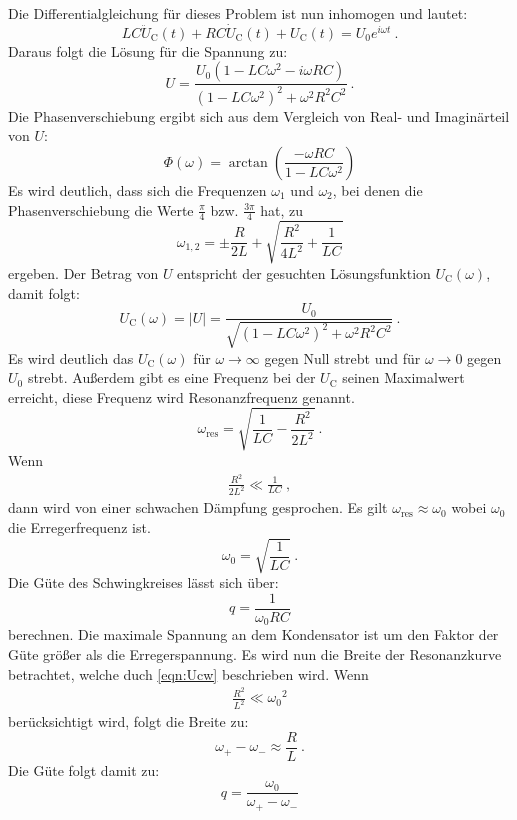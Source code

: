 Die Differentialgleichung für dieses Problem ist nun inhomogen und lautet:
\begin{equation}
	LC \ddot{U}_\text{C}(t) + RC \dot{U}_\text{C}(t) + U_\text{C}(t) = U_0 e^{i \omega t} \ .
\end{equation}
Daraus folgt die Lösung für die Spannung zu:
\begin{equation}
	U = \frac{U_0(1 - LC \omega^2 - i \omega RC)}{(1 - LC \omega^2)^2 + \omega^2 R^2 C^2} \ .
\end{equation}
Die Phasenverschiebung ergibt sich aus dem Vergleich von Real- und Imaginärteil von $U$:
\begin{equation}
	\Phi (\omega) = \arctan \left(\frac{-\omega RC}{1-LC\omega^2}  \right)
\end{equation}
Es wird deutlich, dass sich die Frequenzen $\omega_1$ und $\omega_2$, bei denen die Phasenverschiebung die Werte $\frac{\pi}{4}$ bzw. $\frac{3\pi}{4}$ hat, zu
\begin{equation}
	\omega_{1,2} = \pm \frac{R}{2L} + \sqrt{\frac{R^2}{4L^2} + \frac{1}{LC}}
	\label{eqn:w12}
\end{equation}
ergeben.
Der Betrag von $U$ entspricht der gesuchten Lösungsfunktion $U_\text{C}(\omega)$, damit folgt:
\begin{equation}
	U_\text{C}(\omega) = |U| = \frac{U_0}{\sqrt{(1 - LC \omega^2)^2 + \omega^2 R^2 C^2}} \ .
	\label{eqn:Ucw}
\end{equation}
Es wird deutlich das $U_\text{C}(\omega)$ für $\omega \to \infty$ gegen Null strebt und für $\omega \to 0$ gegen $U_0$ strebt. Außerdem gibt es eine Frequenz bei der $U_\text{C}$ seinen Maximalwert erreicht, diese Frequenz wird Resonanzfrequenz genannt.
\begin{equation}
	\omega_\text{res} = \sqrt{\frac{1}{LC} - \frac{R^2}{2L^2}} \ .
	\label{eqn:wres}
\end{equation}
Wenn
\begin{align*}
	\frac{R^2}{2L^2} \ll \frac{1}{LC} \ ,
\end{align*}
dann wird von einer schwachen Dämpfung gesprochen. Es gilt $\omega_\text{res} \approx \omega_0$ wobei $\omega_0$ die Erregerfrequenz ist.
\begin{equation}
	\omega_0 = \sqrt{\frac{1}{LC}} \ .
\end{equation}
Die Güte des Schwingkreises lässt sich über:
\begin{equation}
	q = \frac{1}{\omega_0 RC}
	\label{eqn:q}
\end{equation}
berechnen. Die maximale Spannung an dem Kondensator ist um den Faktor der Güte größer als die Erregerspannung. Es wird nun die Breite der Resonanzkurve betrachtet, welche duch \ref{eqn:Ucw} beschrieben wird. Wenn
\begin{align*}
	\frac{R^2}{L^2} \ll {\omega_0}^2
\end{align*}
berücksichtigt wird, folgt die Breite zu:
\begin{equation}
	\omega_+ - \omega_- \approx \frac{R}{L} \ .
	\label{eqn:qbreite}
\end{equation}
Die Güte folgt damit zu:
\begin{equation}
	q = \frac{\omega_0}{\omega_+ - \omega_-}
\end{equation}



